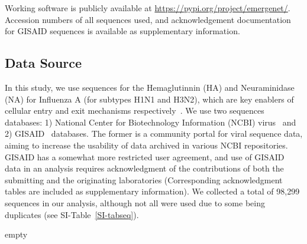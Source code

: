 \documentclass[onecolumn, compsoc,10pt]{IEEEtran}
\begin{document}
Working software is publicly available at \href{https://pypi.org/project/quasinet/}{https://pypi.org/project/emergenet/}.
Accession numbers of all sequences used, and acknowledgement documentation for GISAID sequences is available as supplementary information.





\subsection*{Data Source}

In this study, we use sequences for the Hemaglutinnin (HA)  and Neuraminidase (NA) for Influenza A (for subtypes H1N1 and H3N2), which are key enablers of cellular entry and exit mechanisms respectively~\cite{mcauley2019influenza}. We use two sequences databases: 1) National Center for Biotechnology Information (NCBI) virus~\cite{hatcher2017virus} and 2) GISAID~\cite{bogner2006global} databases. The former is a community portal for viral sequence data, aiming to increase the usability of data archived in various NCBI repositories. GISAID has a somewhat more restricted user agreement, and use of GISAID data in an analysis requires acknowledgment of the contributions of both the submitting and the originating laboratories (Corresponding acknowledgment tables are included as supplementary information). We collected a total of 98,299 sequences in our analysis, although not all were used due to some being duplicates (see SI-Table~\ref{SI-tabseq}).









% 
% 




\clearpage                                                                      
\setcounter{figure}{0}                                    \renewcommand{\figurename}{Extended Data Figure}                               
\setcounter{table}{0}                                     
\renewcommand{\tablename}{Extended Data Table}                                 



\clearpage
empty


\clearpage
\end{document}
